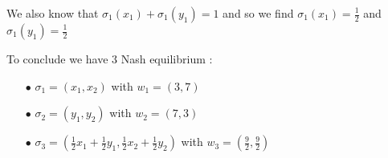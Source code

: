 We also know that $\sigma_1(x_1) + \sigma_1(y_1) = 1$ and so we find $\sigma_1(x_1)=\frac{1}{2}$ and $\sigma_1(y_1)=\frac{1}{2}$

To conclude we have 3 Nash equilibrium :
\begin{itemize}
  \item[$\bullet$]  $\sigma_1 = \left(x_1,x_2\right)$ with $w_1= \left(3,7\right)$
  \item[$\bullet$]  $\sigma_2 = \left(y_1,y_2\right)$ with $w_2= \left(7,3\right)$
  \item[$\bullet$]  $\sigma_3 = \left( \frac{1}{2}x_1 + \frac{1}{2}y_1, \frac{1}{2}x_2 + \frac{1}{2}y_2\right)$ with $w_3= \left(\frac{9}{2},\frac{9}{2}\right)$
\end{itemize}






